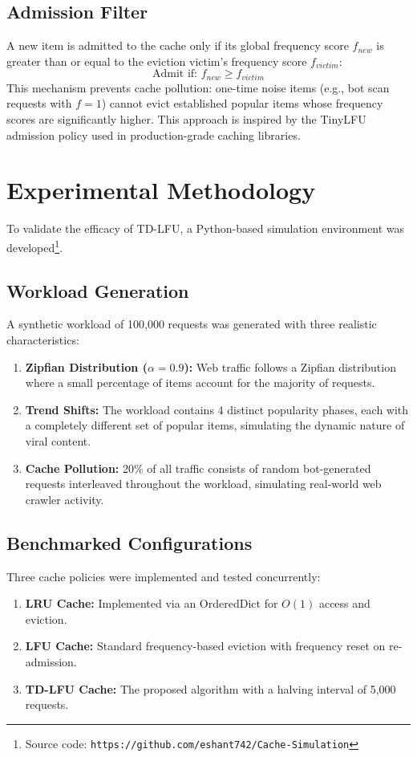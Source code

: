 \documentclass[conference]{IEEEtran}
\begin{document}
\subsection{Admission Filter}
A new item is admitted to the cache only if its global frequency score $f_{new}$ is greater than or equal to the eviction victim's frequency score $f_{victim}$:
\begin{equation}
\text{Admit if: } f_{new} \geq f_{victim}
\end{equation}
This mechanism prevents cache pollution: one-time noise items (e.g., bot scan requests with $f = 1$) cannot evict established popular items whose frequency scores are significantly higher. This approach is inspired by the TinyLFU admission policy used in production-grade caching libraries.

\section{Experimental Methodology}
To validate the efficacy of TD-LFU, a Python-based simulation environment was developed\footnote{Source code: \texttt{https://github.com/eshant742/Cache-Simulation}}.

\subsection{Workload Generation}
A synthetic workload of 100,000 requests was generated with three realistic characteristics:
\begin{enumerate}
    \item \textbf{Zipfian Distribution ($\alpha = 0.9$):} Web traffic follows a Zipfian distribution where a small percentage of items account for the majority of requests.
    \item \textbf{Trend Shifts:} The workload contains 4 distinct popularity phases, each with a completely different set of popular items, simulating the dynamic nature of viral content.
    \item \textbf{Cache Pollution:} 20\% of all traffic consists of random bot-generated requests interleaved throughout the workload, simulating real-world web crawler activity.
\end{enumerate}

\subsection{Benchmarked Configurations}
Three cache policies were implemented and tested concurrently:
\begin{enumerate}
    \item \textbf{LRU Cache:} Implemented via an OrderedDict for $O(1)$ access and eviction.
    \item \textbf{LFU Cache:} Standard frequency-based eviction with frequency reset on re-admission.
    \item \textbf{TD-LFU Cache:} The proposed algorithm with a halving interval of 5,000 requests.
\end{enumerate}
\end{document}
